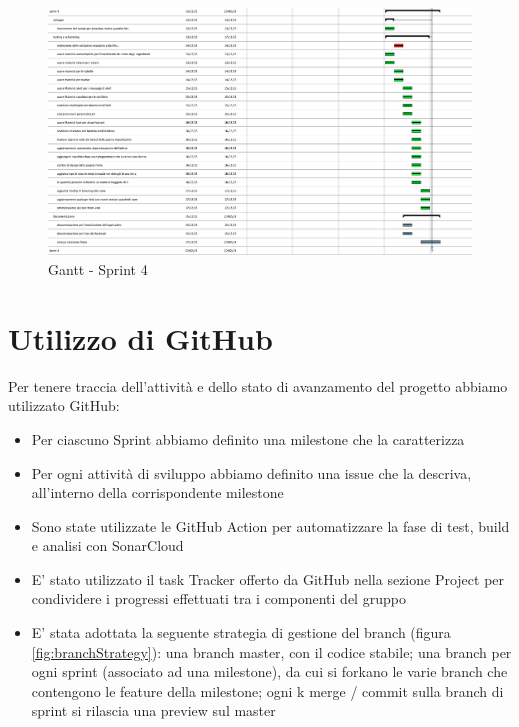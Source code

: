 \documentclass[a4paper,12pt]{report}
\begin{document}
	\begin{figure}[!h]
		\centering
		\includegraphics[width=0.9\linewidth]{image/scrum4.png}
		\caption{Gantt - Sprint 4}\label{fig:scrum4}
	\end{figure}

    	\section{Utilizzo di GitHub}
Per tenere traccia dell'attività e dello stato di avanzamento del progetto abbiamo utilizzato GitHub:
\begin{itemize}
		\item Per ciascuno Sprint abbiamo definito una milestone che la caratterizza
		\item Per ogni attività di sviluppo abbiamo definito una issue che la descriva, all'interno della corrispondente milestone
		\item Sono state utilizzate le GitHub Action per automatizzare la fase di test, build e analisi con SonarCloud
		\item E' stato utilizzato il task Tracker offerto da GitHub nella sezione Project per condividere i progressi effettuati tra i componenti del gruppo
		\item E' stata adottata la seguente strategia di gestione del branch (figura \ref{fig:branchStrategy}): una branch master, con il codice stabile; una branch per ogni sprint (associato ad una milestone), da cui si forkano le varie branch che contengono le feature della milestone; ogni k merge / commit sulla branch di sprint si rilascia una preview sul master
	\end{itemize}
\end{document}
